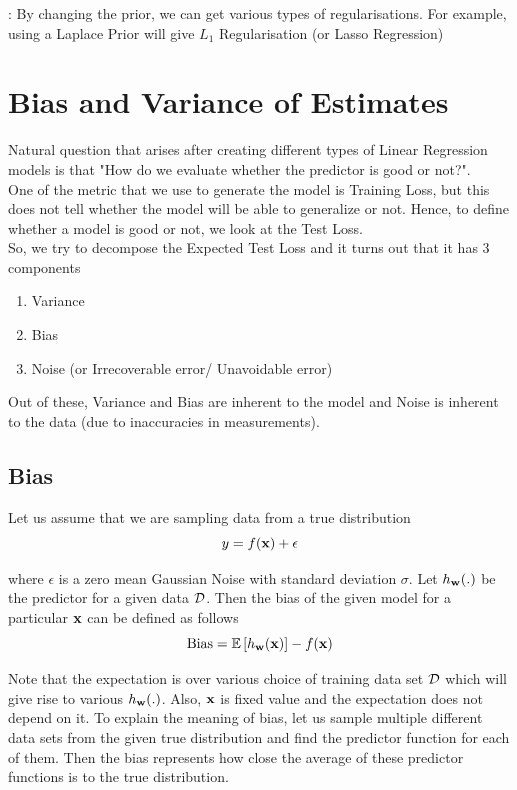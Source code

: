 : By changing the prior, we can get various types of regularisations. For example, using a Laplace Prior will give \(L_1\) Regularisation (or Lasso Regression)

\section{Bias and Variance of Estimates}
Natural question that arises after creating different types of Linear Regression models is that "How do we evaluate whether the predictor is good or not?". \\

One of the metric that we use to generate the model is Training Loss, but this does not tell whether the model will be able to generalize or not. Hence, to define whether a model is good or not, we look at the Test Loss. \\

So, we try to decompose the Expected Test Loss and it turns out that it has 3 components
\begin{enumerate}
  \itemsep-0.3em
  \item Variance
  \item Bias
  \item Noise (or Irrecoverable error/ Unavoidable error)
\end{enumerate}

Out of these, Variance and Bias are inherent to the model and Noise is inherent to the data (due to inaccuracies in measurements).

\subsection{Bias}

Let us assume that we are sampling data from a true distribution
$$
  y = f(\mathbf{x}) + \epsilon
$$

where $\epsilon$ is a zero mean Gaussian Noise with standard deviation $\sigma$. Let $h_{\mathbf{w}}(.)$ be the predictor for a given data $\mathcal{D}$. Then the bias of the given model for a particular $\mathbf{x}$ can be defined as follows
$$
  \text{Bias} = \mathbb{E}\left[h_{\mathbf{w}}(\mathbf{x})\right] - f(\mathbf{x})
$$

Note that the expectation is over various choice of training data set $\mathcal{D}$ which will give rise to various $h_{\mathbf{w}}(.)$. Also, $\mathbf{x}$ is fixed value and the expectation does not depend on it.
To explain the meaning of bias, let us sample multiple different data sets from the given true distribution and find the predictor function for each of them. Then the bias represents how close the average of these predictor functions is to the true distribution.

